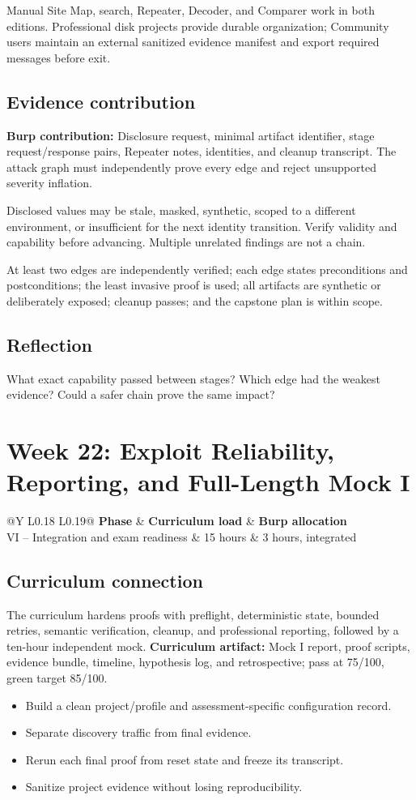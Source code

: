 \documentclass[11pt]{article}
\makeatletter
\newcommand{\weekheader}[5]{%
  \clearpage
  \section{Week #1: #2}
  \begin{tcolorbox}[colback=Navy,colframe=Navy,coltext=white]
    \begin{tabularx}{\linewidth}{@{}Y L{0.18\linewidth} L{0.19\linewidth}@{}}
      \textbf{Phase} & \textbf{Curriculum load} & \textbf{Burp allocation}\\
      #3 & #4 hours & #5 hours, integrated
    \end{tabularx}
  \end{tcolorbox}
}
\newcommand{\weekfield}[2]{%
  \Needspace{5\baselineskip}
  \subsection*{#1}
  #2
}
\newcommand{\curriculumartifact}[1]{\textbf{Curriculum artifact:} #1}
\newcommand{\burpevidence}[1]{\textbf{Burp contribution:} #1}
\makeatother
\begin{document}
\begin{editionbox}
Manual Site Map, search, Repeater, Decoder, and Comparer work in both editions.
Professional disk projects provide durable organization; Community users maintain
an external sanitized evidence manifest and export required messages before exit.
\end{editionbox}

\weekfield{Evidence contribution}{\burpevidence{Disclosure request, minimal
artifact identifier, stage request/response pairs, Repeater notes, identities,
and cleanup transcript.} The attack graph must independently prove every edge
and reject unsupported severity inflation.}

\begin{troubleshootingbox}
Disclosed values may be stale, masked, synthetic, scoped to a different environment,
or insufficient for the next identity transition. Verify validity and capability
before advancing. Multiple unrelated findings are not a chain.
\end{troubleshootingbox}

\begin{checkpoints}
At least two edges are independently verified; each edge states preconditions and
postconditions; the least invasive proof is used; all artifacts are synthetic or
deliberately exposed; cleanup passes; and the capstone plan is within scope.
\end{checkpoints}

\weekfield{Reflection}{What exact capability passed between stages? Which edge
had the weakest evidence? Could a safer chain prove the same impact?}

\weekheader{22}{Exploit Reliability, Reporting, and Full-Length Mock I}{VI -- Integration and exam readiness}{15}{3}

\weekfield{Curriculum connection}{The curriculum hardens proofs with preflight,
deterministic state, bounded retries, semantic verification, cleanup, and
professional reporting, followed by a ten-hour independent mock.
\curriculumartifact{Mock I report, proof scripts, evidence bundle, timeline,
hypothesis log, and retrospective; pass at 75/100, green target 85/100.}}

\begin{objectivebox}
\begin{itemize}
  \item Build a clean project/profile and assessment-specific configuration record.
  \item Separate discovery traffic from final evidence.
  \item Rerun each final proof from reset state and freeze its transcript.
  \item Sanitize project evidence without losing reproducibility.
\end{itemize}
\end{objectivebox}
\end{document}
